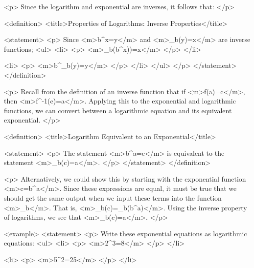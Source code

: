         <p>
            Since the logarithm and exponential are inverses, it follows that:
        </p>

        <definition>
            <title>Properties of Logarithms: Inverse Properties</title>

            <statement>
                <p>
                    Since <m>b^{x}=y</m> and <m>\log_{b}(y)=x</m> are inverse functions;
                    <ul>
                        <li>
                            <p>
                                <m>\log_{b}(b^{x}))=x</m>
                            </p>
                        </li>

                        <li>
                            <p>
                                <m>b^{\log_b(y)}=y</m>
                            </p>
                        </li>
                    </ul>
                </p>
            </statement>
        </definition>

        <p>
            Recall from the definition of an inverse function that if <m>f(a)=c</m>, then <m>f^{-1}(c)=a</m>.
            Applying this to the exponential and logarithmic functions, we can convert between a logarithmic equation and its equivalent exponential.
        </p>

        <definition>
            <title>Logarithm Equivalent to an Exponential</title>

            <statement>
                <p>
                    The statement <m>b^{a}=c</m> is equivalent to the statement <m>\log_{b}(c)=a</m>.
                </p>
            </statement>
        </definition>

        <p>
            Alternatively, we could show this by starting with the exponential function <m>c=b^{a}</m>.
            Since these expressions are equal, it must be true that we should get the same output when we input these terms into the function <m>\log_{b}</m>.
            That is, <m>\log_{b}⁡(c)=\log_{b}⁡(b^{a})</m>.
            Using the inverse property of logarithms, we see that <m>\log_{b}⁡(c)=a</m>.
        </p>

        <example>
            <statement>
                <p>
                    Write these exponential equations as logarithmic equations:
                    <ul>
                        <li>
                            <p>
                                <m>2^{3}=8</m>
                            </p>
                        </li>

                        <li>
                            <p>
                                <m>5^{2}=25</m>
                            </p>
                        </li>

